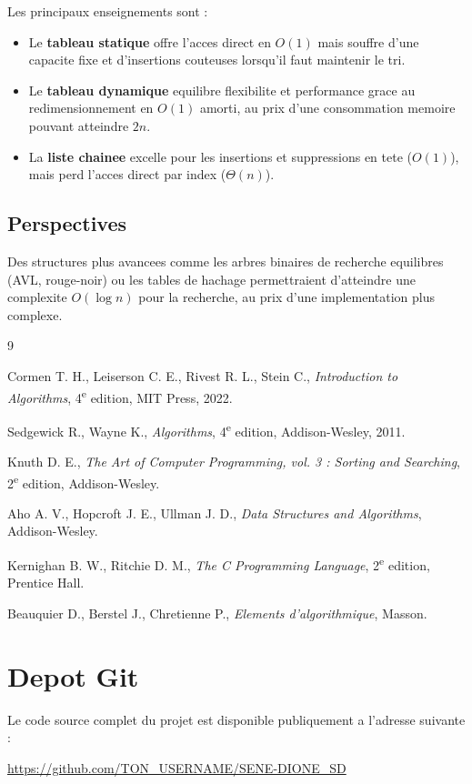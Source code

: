 \documentclass[12pt,a4paper]{article}
\begin{document}
Les principaux enseignements sont :

\begin{itemize}
    \item Le \textbf{tableau statique} offre l'acces direct en $O(1)$
          mais souffre d'une capacite fixe et d'insertions couteuses
          lorsqu'il faut maintenir le tri.

    \item Le \textbf{tableau dynamique} equilibre flexibilite et
          performance grace au redimensionnement en $O(1)$ amorti,
          au prix d'une consommation memoire pouvant atteindre $2n$.

    \item La \textbf{liste chainee} excelle pour les insertions et
          suppressions en tete ($O(1)$), mais perd l'acces direct
          par index ($\Theta(n)$).
\end{itemize}

\subsection{Perspectives}

Des structures plus avancees comme les arbres binaires de recherche
equilibres (AVL, rouge-noir) ou les tables de hachage permettraient
d'atteindre une complexite $O(\log n)$ pour la recherche, au prix
d'une implementation plus complexe.

\begin{thebibliography}{9}

Cormen T. H., Leiserson C. E., Rivest R. L., Stein C.,
\textit{Introduction to Algorithms}, 4\textsuperscript{e} edition,
MIT Press, 2022.

Sedgewick R., Wayne K.,
\textit{Algorithms}, 4\textsuperscript{e} edition,
Addison-Wesley, 2011.

Knuth D. E.,
\textit{The Art of Computer Programming, vol. 3 : Sorting and Searching},
2\textsuperscript{e} edition, Addison-Wesley.

Aho A. V., Hopcroft J. E., Ullman J. D.,
\textit{Data Structures and Algorithms},
Addison-Wesley.

Kernighan B. W., Ritchie D. M.,
\textit{The C Programming Language},
2\textsuperscript{e} edition, Prentice Hall.

Beauquier D., Berstel J., Chretienne P.,
\textit{Elements d'algorithmique},
Masson.

\end{thebibliography}

\section*{Depot Git}
Le code source complet du projet est disponible publiquement a
l'adresse suivante :
\begin{center}
\url{https://github.com/TON_USERNAME/SENE-DIONE_SD}
\end{center}
\end{document}
